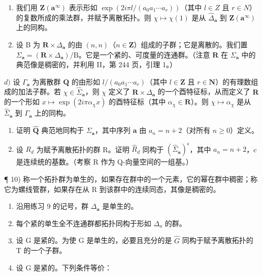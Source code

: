 \begin{enumerate}
\def\labelenumi{\alph{enumi})}
\setcounter{enumi}{1}
\item
  我们用 \(\mathbf{Z}(\boldsymbol{a}^{\infty})\) 表示形如 \(\exp(2i\pi l/(a_{0}a_{1}\cdots a_{r}))\)（其中 \(l \in Z\) 且 \(r \in N\)）的复数所成的乘法群，并赋予离散拓扑。则 \(\chi \mapsto \chi(1)\) 是从 \(\widehat{\Delta}_{\boldsymbol{a}}\) 到 \(\mathbf{Z}(\boldsymbol{a}^{\infty})\) 上的同构。
\item
  设 B 为 \(\mathbf{R} \times \Delta_{\boldsymbol{a}}\) 的由 \((n, n)\)（\(n \in \mathbf{Z}\)）组成的子群；它是离散的。我们置 \(\Sigma_{\boldsymbol{a}} = (\mathbf{R} \times \Delta_{\boldsymbol{a}})/\mathrm{B}\)。它是一个紧的、可度量的连通群。（注意 \(\mathbf{R}\) 在 \(\Sigma_{\boldsymbol{a}}\) 中的典范像是稠密的，并利用 II，第 244 页，引理 1。）
\end{enumerate}

\(d)\) 设 \(\Gamma_{\boldsymbol{a}}\) 为离散群 \(\mathbf{Q}\) 的由形如 \(l/(a_{0}a_{1}\cdots a_{r})\)（其中 \(l\in\mathbf{Z}\) 且 \(r\in\mathbf{N}\)）的有理数组成的加法子群。若 \(\chi\in\widehat{\Sigma}_{\boldsymbol{a}}\)，则 \(\chi\) 定义了 \(\mathbf{R}\times\Delta_{\boldsymbol{a}}\) 的一个酉特征标，从而定义了 \(\mathbf{R}\) 的一个形如 \(x\mapsto\exp(2i\pi\alpha_{\chi}x)\) 的酉特征标（其中 \(\alpha_{\chi}\in\mathbf{R}\)）。则 \(\chi\mapsto\alpha_{\chi}\) 是从 \(\widehat{\Sigma}_{\boldsymbol{a}}\) 到 \(\Gamma_{\boldsymbol{a}}\) 上的同构。

\begin{enumerate}
\def\labelenumi{\alph{enumi})}
\setcounter{enumi}{4}
\item
  证明 \(\widehat{\mathbf{Q}}\) 典范地同构于 \(\Sigma_{\pmb{a}}\)，其中序列 \(\pmb{a}\) 由 \(a_{n} = n + 2\)（对所有 \(n \geqslant 0\)）定义。
\item
  设 \(R_{d}\) 为赋予离散拓扑的群 R。证明 \(\widehat{R}_{d}\) 同构于 \((\widehat{\Sigma}_{\boldsymbol{a}})^{\mathfrak{c}}\)，其中 \(a_{n}=n+2\)，c 是连续统的基数。（考察 R 作为 Q-向量空间的一组基。）
\end{enumerate}

¶ 10) 称一个拓扑群为单生的，如果存在群中的一个元素，它的幂在群中稠密；称它为螺线管群，如果存在从 R 到该群中的连续同态，其像是稠密的。

\begin{enumerate}
\def\labelenumi{\alph{enumi})}
\item
  沿用练习 9 的记号，群 \(\Delta_{\pmb{a}}\) 是单生的。
\item
  每个紧的单生全不连通群都拓扑同构于形如 \(\Delta_{a}\) 的群。
\item
  设 G 是紧的。为使 G 是单生的，必要且充分的是 \(\widehat{G}\) 同构于赋予离散拓扑的 T 的一个子群。
\item
  设 G 是紧的。下列条件等价：
\end{enumerate}

